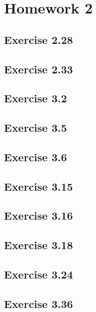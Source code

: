 \section{Homework 2}
\subsection{Exercise 2.28}

\subsection{Exercise 2.33}

\subsection{Exercise 3.2}

\subsection{Exercise 3.5}

\subsection{Exercise 3.6}

\subsection{Exercise 3.15}

\subsection{Exercise 3.16}

\subsection{Exercise 3.18}

\subsection{Exercise 3.24}

\subsection{Exercise 3.36}


